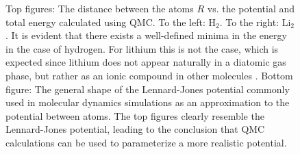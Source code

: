 \begin{figure}
 \begin{center}
  \caption{Top figures: The distance between the atoms $R$ vs. the potential and total energy calculated using QMC. To the left: $\mathrm{H_2}$. To the right: $\mathrm{Li_2}$. It is evident that there exists a well-defined minima in the energy in the case of hydrogen. For lithium this is not the case, which is expected since lithium does not appear naturally in a diatomic gas phase, but rather as an ionic compound in other molecules \cite{UniversityPhysics}. Bottom figure: The general shape of the Lennard-Jones potential commonly used in molecular dynamics simulations as an approximation to the potential between atoms. The top figures clearly resemble the Lennard-Jones potential, leading to the conclusion that QMC calculations can be used to parameterize a more realistic potential.}

\end{center}
\end{figure}
